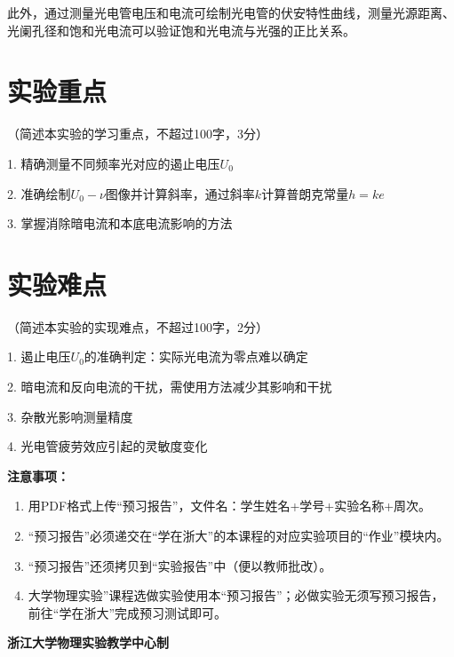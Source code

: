 \documentclass[10pt,a4paper]{ctexart}
\newcommand{\myspace}[1]{\par\vspace{#1\baselineskip}} %
\newcommand{\sihao}{\fontsize{14pt}{18pt}\selectfont}
\newcommand{\xiaosi}{\fontsize{12pt}{16pt}\selectfont}
\begin{document}
此外，通过测量光电管电压和电流可绘制光电管的伏安特性曲线，测量光源距离、光阑孔径和饱和光电流可以验证饱和光电流与光强的正比关系。
\myspace{2}

\section{实验重点}

\xiaosi（简述本实验的学习重点，不超过100字，3分）

1. 精确测量不同频率光对应的遏止电压$U_0$ 
 
2. 准确绘制$U_0-\nu$图像并计算斜率，通过斜率$k$计算普朗克常量$h = ke$ 

3. 掌握消除暗电流和本底电流影响的方法
\myspace{2}

\section{实验难点}

\xiaosi（简述本实验的实现难点，不超过100字，2分）

1. 遏止电压$U_0$的准确判定：实际光电流为零点难以确定 

2. 暗电流和反向电流的干扰，需使用方法减少其影响和干扰 

3. 杂散光影响测量精度 

4. 光电管疲劳效应引起的灵敏度变化


\vspace{3cm}

\sihao\textbf{注意事项：}
\xiaosi
\begin{enumerate}
    \item 用PDF格式上传“预习报告”，文件名：学生姓名+学号+实验名称+周次。
    \item “预习报告”必须递交在“学在浙大”的本课程的对应实验项目的“作业”模块内。
    \item “预习报告”还须拷贝到“实验报告”中（便以教师批改）。
    \item 大学物理实验”课程选做实验使用本“预习报告”；必做实验无须写预习报告，前往“学在浙大”完成预习测试即可。
\end{enumerate}

\vspace{1cm}
\xiaosi\centering \textbf{浙江大学物理实验教学中心制}
\end{document}
